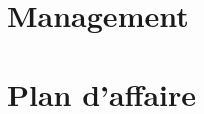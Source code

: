\begin{refsection}
\chapter[Y]{Management}
\chapter[Z]{Plan d'affaire}


\biblio
\end{refsection}



